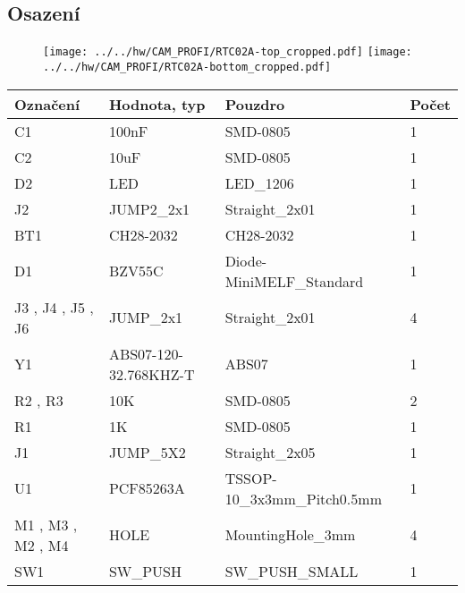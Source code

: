 \subsection{Osazení}


\begin{figure}[ht!]
	\centering
	\texttt{[image: ../../hw/CAM\_PROFI/RTC02A-top\_cropped.pdf]}
	\qquad
	\texttt{[image: ../../hw/CAM\_PROFI/RTC02A-bottom\_cropped.pdf]}
\end{figure}

\begin{center}
  \begin{tabular}{ | l | l | l | l |}
    \hline
    Označení & Hodnota, typ & Pouzdro & Počet \\ \hline
    \hline
			C1
 & 100nF & SMD-0805 & 1\\ \hline
			C2
 & 10uF & SMD-0805 & 1\\ \hline
			D2
 & LED & LED\_1206 & 1\\ \hline
			J2
 & JUMP2\_2x1 & Straight\_2x01 & 1\\ \hline
			BT1
 & CH28-2032 & CH28-2032 & 1\\ \hline
			D1
 & BZV55C & Diode-MiniMELF\_Standard & 1\\ \hline
			J3
, J4
, J5
, J6
 & JUMP\_2x1 & Straight\_2x01 & 4\\ \hline
			Y1
 & ABS07-120-32.768KHZ-T & ABS07 & 1\\ \hline
			R2
, R3
 & 10K & SMD-0805 & 2\\ \hline
			R1
 & 1K & SMD-0805 & 1\\ \hline
			J1
 & JUMP\_5X2 & Straight\_2x05 & 1\\ \hline
			U1
 & PCF85263A & TSSOP-10\_3x3mm\_Pitch0.5mm & 1\\ \hline
			M1
, M3
, M2
, M4
 & HOLE & MountingHole\_3mm & 4\\ \hline
			SW1
 & SW\_PUSH & SW\_PUSH\_SMALL & 1\\ \hline
	
  \end{tabular}
\end{center}